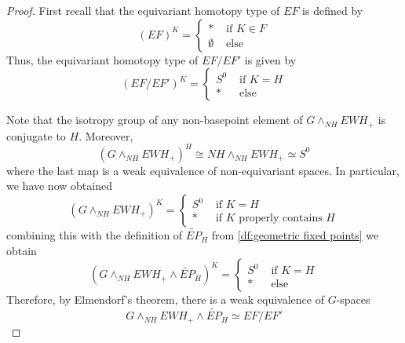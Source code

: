 \documentclass[11pt]{amsart}
\newcommand{\Osp}{\mathcal{OS}}
\theoremstyle{plain}   %
\newtheorem{lem}[thm]{Lemma}
\theoremstyle{definition}
\theoremstyle{remark}
\numberwithin{equation}{section}
\begin{document}
\begin{proof}
First recall that the equivariant homotopy type of $EF$ is defined by 
\[
(EF)^K = \begin{cases}
* & \text{ if } K\in F\\
\emptyset & \text{ else }
\end{cases}
\]
Thus, the equivariant homotopy type of $EF/EF'$ is given by 
\[
(EF/EF')^K = \begin{cases}
S^0 & \text{ if } K = H\\
* & \text{ else }
\end{cases} 
\]

Note that the isotropy group of any non-basepoint element of $G\wedge_{NH}EWH_+$ is conjugate to $H$. Moreover, 
\[
(G\wedge_{NH}EWH_+)^H \cong NH\wedge_{NH}EWH_+ \simeq S^0
\]
where the last map is a weak equivalence of non-equivariant spaces. In particular, we have now obtained
\[
(G\wedge_{NH}EWH_+)^K = \begin{cases}
S^0 & \text{ if } K=H\\
* & \text{ if $K$ properly contains $H$}
\end{cases}
\]
combining this with the definition of $\widetilde{EP}_H$ from \cref{df:geometric fixed points} we obtain
\[
(G\wedge_{NH}EWH_+ \wedge\widetilde{EP}_H)^K = \begin{cases}
S^0 & \text{ if } K = H\\
* & \text{ else }
\end{cases}
\]
Therefore, by Elmendorf's theorem, there is a weak equivalence of $G$-spaces
\[
G\wedge_{NH}EWH_+ \wedge\widetilde{EP}_H \simeq EF/EF'
\]
\end{proof}

\end{document}
